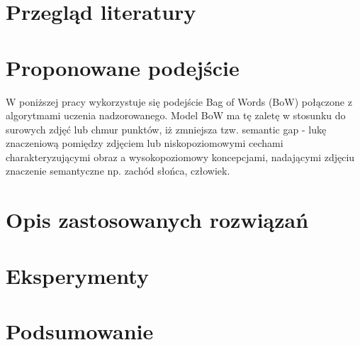 \documentclass[a4paper,10pt]{article}
\begin{document}
\section{Przegląd literatury}

\section{Proponowane podejście}

	W poniższej pracy wykorzystuje się podejście Bag of Words (BoW) połączone z algorytmami uczenia nadzorowanego. Model BoW ma tę zaletę w stosunku do surowych zdjęć lub chmur punktów, iż zmniejsza tzw. semantic gap - lukę znaczeniową pomiędzy zdjęciem lub niskopoziomowymi cechami charakteryzującymi obraz a wysokopoziomowy koncepcjami, nadającymi zdjęciu znaczenie semantyczne np. zachód słońca, człowiek. 

\section{Opis zastosowanych rozwiązań}

\section{Eksperymenty}

\section{Podsumowanie}


\end{document}
